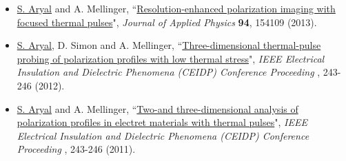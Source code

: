 \documentclass[paper=letter,fontsize=11pt]{scrartcl} %
\newcommand{\PaperEntry}[7]{
		\noindent #1, ``\href{#7}{#2}", \textit{#3} \textbf{#4}, #5 (#6).}
\begin{document}
{\begin{itemize}
\item \PaperEntry{\underline{S. Aryal} and A. Mellinger}{Resolution-enhanced polarization imaging with focused thermal pulses}{Journal of Applied Physics}{94}{154109}{2013}{}

\item \PaperEntry{\underline{S. Aryal}, D. Simon and A. Mellinger}{Three-dimensional thermal-pulse probing of polarization profiles with low thermal stress}{IEEE Electrical Insulation and Dielectric Phenomena (CEIDP) Conference Proceeding}{}{243-246}{2012}{}

\item \PaperEntry{\underline{S. Aryal} and A. Mellinger}{Two-and three-dimensional analysis of polarization profiles in electret materials with thermal pulses}{IEEE Electrical Insulation and Dielectric Phenomena (CEIDP) Conference Proceeding}{}{243-246}{2011}{}



\end{itemize}}
\end{document}
